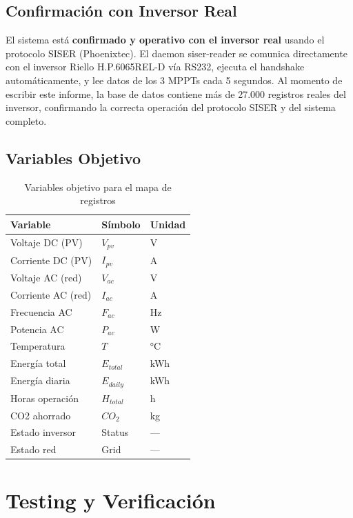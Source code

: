 \documentclass[12pt,a4paper]{article}
\begin{document}
\subsection{Confirmaci\'on con Inversor Real}

El sistema est\'a \textbf{confirmado y operativo con el inversor real} usando el protocolo SISER (Phoenixtec). El daemon siser-reader se comunica directamente con el inversor Riello H.P.6065REL-D v\'ia RS232, ejecuta el handshake autom\'aticamente, y lee datos de los 3 MPPTs cada 5 segundos. Al momento de escribir este informe, la base de datos contiene m\'as de 27.000 registros reales del inversor, confirmando la correcta operaci\'on del protocolo SISER y del sistema completo.

\subsection{Variables Objetivo}

\begin{table}[H]
\centering
\begin{tabular}{lll}
\toprule
\textbf{Variable} & \textbf{S\'imbolo} & \textbf{Unidad} \\
\midrule
Voltaje DC (PV) & $V_{pv}$ & V \\
Corriente DC (PV) & $I_{pv}$ & A \\
Voltaje AC (red) & $V_{ac}$ & V \\
Corriente AC (red) & $I_{ac}$ & A \\
Frecuencia AC & $F_{ac}$ & Hz \\
Potencia AC & $P_{ac}$ & W \\
Temperatura & $T$ & °C \\
Energ\'ia total & $E_{total}$ & kWh \\
Energ\'ia diaria & $E_{daily}$ & kWh \\
Horas operaci\'on & $H_{total}$ & h \\
CO2 ahorrado & $CO_2$ & kg \\
Estado inversor & Status & --- \\
Estado red & Grid & --- \\
\bottomrule
\end{tabular}
\caption{Variables objetivo para el mapa de registros}
\end{table}

\section{Testing y Verificaci\'on}
\end{document}

